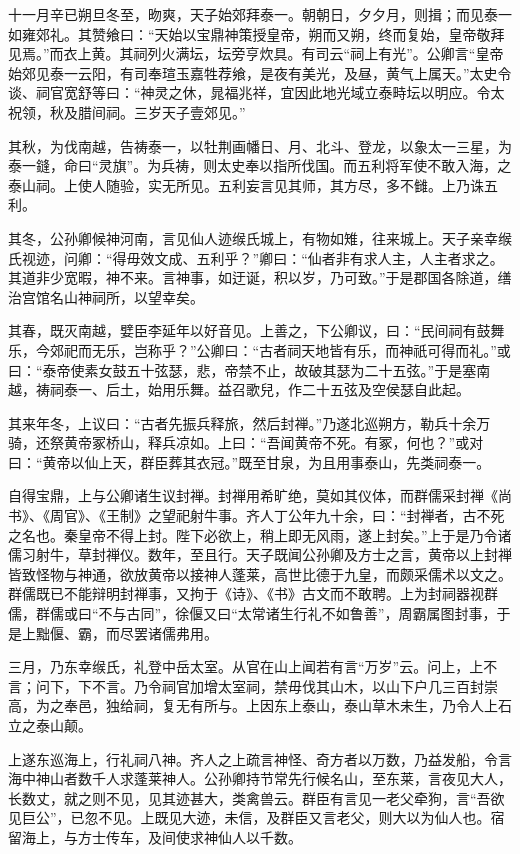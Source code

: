 \documentclass[]{article}
\begin{document}
十一月辛已朔旦冬至，昒爽，天子始郊拜泰一。朝朝日，夕夕月，则揖；而见泰一如雍郊礼。其赞飨曰：``天始以宝鼎神策授皇帝，朔而又朔，终而复始，皇帝敬拜见焉。''而衣上黄。其祠列火满坛，坛旁亨炊具。有司云``祠上有光''。公卿言``皇帝始郊见泰一云阳，有司奉瑄玉嘉牲荐飨，是夜有美光，及昼，黄气上属天。''太史令谈、祠官宽舒等曰：``神灵之休，晁福兆祥，宜因此地光域立泰畤坛以明应。令太祝领，秋及腊间祠。三岁天子壹郊见。''

其秋，为伐南越，告祷泰一，以牡荆画幡日、月、北斗、登龙，以象太一三星，为泰一鏠，命曰``灵旗''。为兵祷，则太史奉以指所伐国。而五利将军使不敢入海，之泰山祠。上使人随验，实无所见。五利妄言见其师，其方尽，多不雠。上乃诛五利。

其冬，公孙卿候神河南，言见仙人迹缑氏城上，有物如雉，往来城上。天子亲幸缑氏视迹，问卿：``得毋效文成、五利乎？''卿曰：``仙者非有求人主，人主者求之。其道非少宽暇，神不来。言神事，如迂诞，积以岁，乃可致。''于是郡国各除道，缮治宫馆名山神祠所，以望幸矣。

其春，既灭南越，嬖臣李延年以好音见。上善之，下公卿议，曰：``民间祠有鼓舞乐，今郊祀而无乐，岂称乎？''公卿曰：``古者祠天地皆有乐，而神祇可得而礼。''或曰：``泰帝使素女鼓五十弦瑟，悲，帝禁不止，故破其瑟为二十五弦。''于是塞南越，祷祠泰一、后土，始用乐舞。益召歌兒，作二十五弦及空侯瑟自此起。

其来年冬，上议曰：``古者先振兵释旅，然后封禅。''乃遂北巡朔方，勒兵十余万骑，还祭黄帝冢桥山，释兵凉如。上曰：``吾闻黄帝不死。有冢，何也？''或对曰：``黄帝以仙上天，群臣葬其衣冠。''既至甘泉，为且用事泰山，先类祠泰一。

自得宝鼎，上与公卿诸生议封禅。封禅用希旷绝，莫如其仪体，而群儒采封禅《尚书》、《周官》、《王制》之望祀射牛事。齐人丁公年九十余，曰：``封禅者，古不死之名也。秦皇帝不得上封。陛下必欲上，稍上即无风雨，遂上封矣。''上于是乃令诸儒习射牛，草封禅仪。数年，至且行。天子既闻公孙卿及方士之言，黄帝以上封禅皆致怪物与神通，欲放黄帝以接神人蓬莱，高世比德于九皇，而颇采儒术以文之。群儒既已不能辩明封禅事，又拘于《诗》、《书》古文而不敢聘。上为封祠器视群儒，群儒或曰``不与古同''，徐偃又曰``太常诸生行礼不如鲁善''，周霸属图封事，于是上黜偃、霸，而尽罢诸儒弗用。

三月，乃东幸缑氏，礼登中岳太室。从官在山上闻若有言``万岁''云。问上，上不言；问下，下不言。乃令祠官加增太室祠，禁毋伐其山木，以山下户几三百封崇高，为之奉邑，独给祠，复无有所与。上因东上泰山，泰山草木未生，乃令人上石立之泰山颠。

上遂东巡海上，行礼祠八神。齐人之上疏言神怪、奇方者以万数，乃益发船，令言海中神山者数千人求蓬莱神人。公孙卿持节常先行候名山，至东莱，言夜见大人，长数丈，就之则不见，见其迹甚大，类禽兽云。群臣有言见一老父牵狗，言``吾欲见巨公''，已忽不见。上既见大迹，未信，及群臣又言老父，则大以为仙人也。宿留海上，与方士传车，及间使求神仙人以千数。
\end{document}
